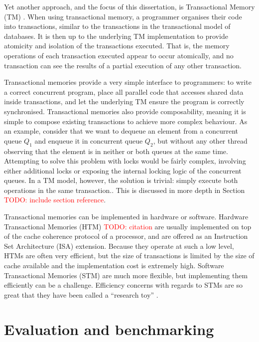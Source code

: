 \documentclass[12pt,a4paper,oneside,openright]{report}
\newcommand{\todo}[1]{\textcolor{red}{TODO: #1}}
\begin{document}
Yet another approach, and the focus of this dissertation, is
Transactional Memory (TM) \cite{TMBook}. When using transactional
memory, a programmer organises their code into transactions, similar
to the transactions in the transactional model of databases. It is
then up to the underlying TM implementation to provide atomicity and
isolation of the transactions executed. That is, the memory operations
of each transaction executed appear to occur atomically, and no
transaction can see the results of a partial execution of any other
transaction.

Transactional memories provide a very simple interface to programmers:
to write a correct concurrent program, place all parallel code that
accesses shared data inside transactions, and let the underlying TM
ensure the program is correctly synchronised. Transactional memories
also provide composability, meaning it is simple to compose existing
transactions to achieve more complex behaviour. As an example,
consider that we want to dequeue an element from a concurrent queue
$Q_1$ and enqueue it in concurrent queue $Q_2$, but without any other
thread observing that the element is in neither or both queues at the
same time. Attempting to solve this problem with locks would be fairly
complex, involving either additional locks or exposing the internal
locking logic of the concurrent queues. In a TM model, however, the
solution is trivial: simply execute both operations in the same
transaction.. This is discussed in more depth in Section \todo{include
  section reference}.

Transactional memories can be implemented in hardware or
software. Hardware Transactional Memories (HTM) \todo{citation} are
usually implemented on top of the cache coherence protocol of a
processor, and are offered as an Instruction Set Architecture (ISA)
extension. Because they operate at such a low level, HTMs are often
very efficient, but the size of transactions is limited by the size of
cache available and the implementation cost is extremely
high. Software Transactional Memories (STM) \cite{STM} are much more
flexible, but implementing them efficiently can be a
challenge. Efficiency concerns with regards to STMs are so great that
they have been called a ``research toy'' \cite{Toy}.

\section{Evaluation and benchmarking}
\label{sec:eval-benchm}
\end{document}
